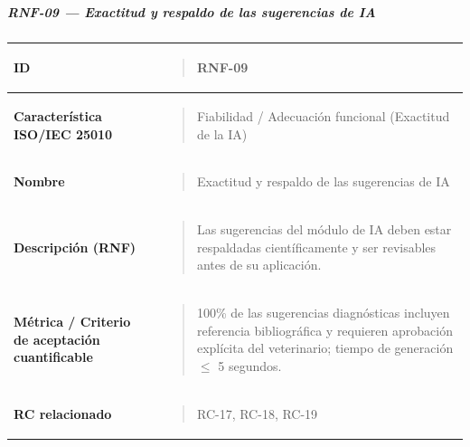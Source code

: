 \documentclass[
]{article}
\newcounter{none} %
\begin{document}
\subparagraph{RNF-09 --- Exactitud y respaldo de las sugerencias de
IA}\label{rnf-09-exactitud-y-respaldo-de-las-sugerencias-de-ia}

{\def\LTcaptype{none} %
\begin{longtable}[]{@{}
  >{\raggedright\arraybackslash}p{}
  >{\raggedright\arraybackslash}p{}@{}}
\toprule\noalign{}
\begin{minipage}[b]{\linewidth}\raggedright
\textbf{ID}
\end{minipage} & \begin{minipage}[b]{\linewidth}\raggedright
\begin{quote}
RNF-09
\end{quote}
\end{minipage} \\
\midrule\noalign{}
\endhead
\bottomrule\noalign{}
\endlastfoot
\textbf{Característica ISO/IEC 25010} & \begin{minipage}[t]{\linewidth}\raggedright
\begin{quote}
Fiabilidad / Adecuación funcional (Exactitud de la IA)
\end{quote}
\end{minipage} \\
\textbf{Nombre} & \begin{minipage}[t]{\linewidth}\raggedright
\begin{quote}
Exactitud y respaldo de las sugerencias de IA
\end{quote}
\end{minipage} \\
\textbf{Descripción (RNF)} & \begin{minipage}[t]{\linewidth}\raggedright
\begin{quote}
Las sugerencias del módulo de IA deben estar respaldadas
científicamente y ser revisables antes de su aplicación.
\end{quote}
\end{minipage} \\
\textbf{Métrica / Criterio de aceptación cuantificable} & \begin{minipage}[t]{\linewidth}\raggedright
\begin{quote}
100\% de las sugerencias diagnósticas incluyen referencia
bibliográfica y requieren aprobación explícita del veterinario; tiempo
de generación \(\leq\) 5 segundos.
\end{quote}
\end{minipage} \\
\textbf{RC relacionado} & \begin{minipage}[t]{\linewidth}\raggedright
\begin{quote}
RC-17, RC-18, RC-19
\end{quote}
\end{minipage} \\
\end{longtable}
}
\end{document}
